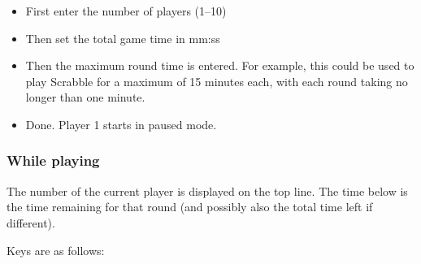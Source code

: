 \begin{itemize}
  \item First enter the number of players (1--10)
  \item Then set the total game time in mm:ss
  \item Then the maximum round time is entered.  For example, this could
  be used to play Scrabble for a maximum of 15 minutes each, with each
  round taking no longer than one minute.
  \item Done. Player 1 starts in paused mode.
\end{itemize}

\subsubsection{While playing}
The number of the current player is displayed on the top line. The time
below is the time remaining for that round (and possibly also the total
time left if different).

Keys are as follows:

